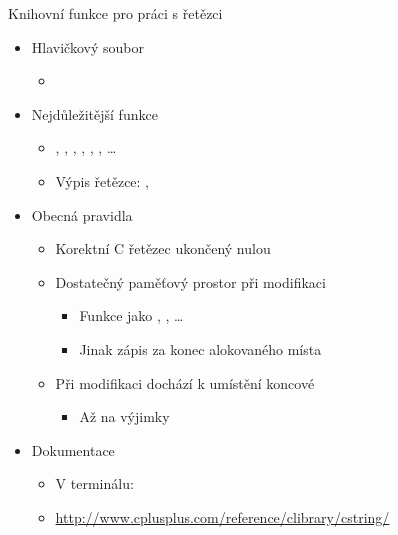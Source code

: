 \begin{frame}{Knihovní funkce pro práci s řetězci}

  \begin{itemize}
    \item Hlavičkový soubor 
    \begin{itemize}
      \item {}
    \end{itemize}

    \pause

    \item Nejdůležitější funkce
    \begin{itemize}
      \item {}, , , ,
        , , \dots
      \item Výpis řetězce: , 
    \end{itemize}

    \pause

    \item Obecná pravidla
    \begin{itemize}
      \item Korektní C řetězec ukončený nulou

      \pause

      \item Dostatečný paměťový prostor při modifikaci
      \begin{itemize}
	\item Funkce jako , , \dots
	\item Jinak zápis za konec alokovaného místa
      \end{itemize}

      \pause

      \item Při modifikaci dochází k umístění koncové 
      \begin{itemize}
	\item Až na výjimky
      \end{itemize}

    \end{itemize}

    \pause

    \item Dokumentace
    \begin{itemize}
      \item V terminálu: 
      \item \url{http://www.cplusplus.com/reference/clibrary/cstring/}
    \end{itemize}

  \end{itemize}

\end{frame}

